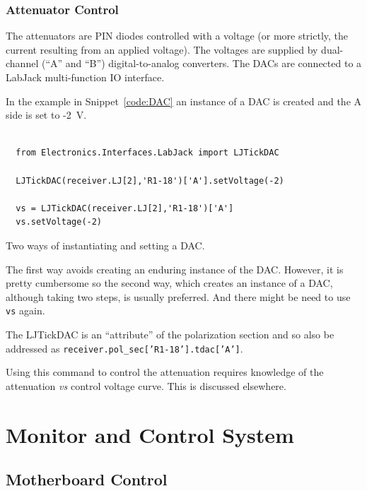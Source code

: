 \documentclass[letterpaper,11pt]{book}
\begin{document}
\subsection{Attenuator Control}

The attenuators are PIN diodes
controlled with a voltage (or more strictly, the current resulting from an
applied voltage).  The voltages are supplied by dual-channel (``A'' and
``B'') digital-to-analog converters.  The DACs are connected to a LabJack
multi-function IO interface.

In the example in Snippet~\ref{code:DAC}
an instance of a DAC is created and the A side is set to -2~V.
\begin{code}[h!tb]
\begin{center}
\begin{verbatim}

  from Electronics.Interfaces.LabJack import LJTickDAC
  
  LJTickDAC(receiver.LJ[2],'R1-18')['A'].setVoltage(-2)
  
  vs = LJTickDAC(receiver.LJ[2],'R1-18')['A']
  vs.setVoltage(-2)\end{verbatim}
\caption{\label{code:DAC}Two ways of instantiating and setting a DAC.}  
\end{center}
\end{code}
The first way avoids creating an enduring instance of the DAC.  However, it is
pretty cumbersome so the second way, which creates an instance of a DAC,
although taking two steps, is usually preferred.  And there might be need to
use {\tt vs} again.

The LJTickDAC is an ``attribute'' of the polarization section and so also be 
addressed as {\tt receiver.pol\_sec['R1-18'].tdac['A']}.

Using this command to control the attenuation requires knowledge of the 
attenuation {\it vs} control voltage curve.  This is discussed elsewhere.


\chapter{Monitor and Control System}\label{chap:MandC}

\section{Motherboard Control}
\end{document}
